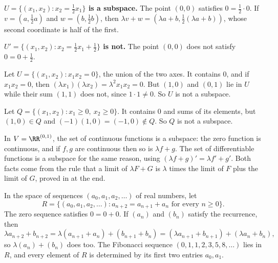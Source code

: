 \documentclass[10pt]{scrartcl}
\begin{document}
\begin{example*}
  \textbf{$U=\{(x_1,x_2):x_2=\tfrac12x_1\}$ is a subspace.} The point $(0,0)$ satisfies $0=\tfrac12\cdot0$. If $v=(a,\tfrac12a)$ and $w=(b,\tfrac12b)$, then $\lambda v+w=(\lambda a+b,\tfrac12(\lambda a+b))$, whose second coordinate is half of the first.

  \textbf{$U'=\{(x_1,x_2):x_2=\tfrac12x_1+\tfrac12\}$ is not.} The point $(0,0)$ does not satisfy $0=0+\tfrac12$.
\end{example*}

\begin{example*}
  Let $U=\{(x_1,x_2):x_1x_2=0\}$, the union of the two axes. It contains $0$, and if $x_1x_2=0$, then $(\lambda x_1)(\lambda x_2)=\lambda^2x_1x_2=0$. But $(1,0)$ and $(0,1)$ lie in $U$ while their sum $(1,1)$ does not, since $1\cdot1\ne0$. So $U$ is not a subspace.
\end{example*}

\begin{example*}
  Let $Q=\{(x_1,x_2):x_1\ge0,\ x_2\ge0\}$. It contains $0$ and sums of its elements, but $(1,0)\in Q$ and $(-1)(1,0)=(-1,0)\notin Q$. So $Q$ is not a subspace.
\end{example*}

\begin{example*}
  In $V=\RR^{(0,1)}$, the set of continuous functions is a subspace: the zero function is continuous, and if $f,g$ are continuous then so is $\lambda f+g$. The set of differentiable functions is a subspace for the same reason, using $(\lambda f+g)'=\lambda f'+g'$. Both facts come from the rule that a limit of $\lambda F+G$ is $\lambda$ times the limit of $F$ plus the limit of $G$, proved in  at the end.
\end{example*}

\begin{example*}
  In the space of sequences $(a_0,a_1,a_2,\dots)$ of real numbers, let
  \[
    R=\{(a_0,a_1,a_2,\dots): a_{n+2}=a_{n+1}+a_n \text{ for every } n\ge0\}.
  \]
  The zero sequence satisfies $0=0+0$. If $(a_n)$ and $(b_n)$ satisfy the recurrence, then
  \[
    \lambda a_{n+2}+b_{n+2}=\lambda(a_{n+1}+a_n)+(b_{n+1}+b_n)=(\lambda a_{n+1}+b_{n+1})+(\lambda a_n+b_n),
  \]
  so $\lambda(a_n)+(b_n)$ does too. The Fibonacci sequence $(0,1,1,2,3,5,8,\dots)$ lies in $R$, and every element of $R$ is determined by its first two entries $a_0,a_1$.
\end{example*}
\end{document}
